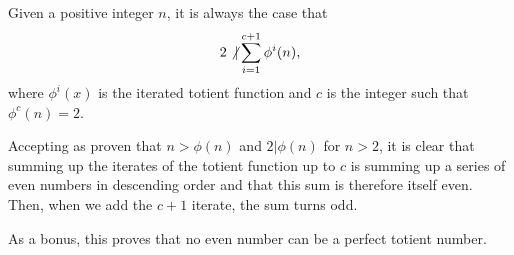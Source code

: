 \documentclass[12pt]{article}
\begin{document}
Given a positive integer $n$, it is always the case that $$2 \not\vert \sum_{i = 1}^{c + 1} \phi^i(n),$$ where $\phi^i(x)$ is the iterated totient function and $c$ is the integer such that $\phi^c(n) = 2$.

Accepting as proven that $n > \phi(n)$ and $2 | \phi(n)$ for $n > 2$, it is clear that summing up the iterates of the totient function up to $c$ is summing up a series of even numbers in descending order and that this sum is therefore itself even. Then, when we add the $c + 1$ iterate, the sum turns odd.

As a bonus, this proves that no even number can be a perfect totient number.
\end{document}
